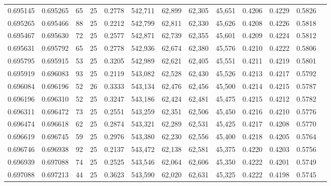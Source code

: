 \begin{tabular}{rrrrrrrrrrrrr}
0.695145 & 0.695265 &    65 &  25 &                                     0.2778 & 542,711 &  62,899 &  62,305 &  45,651 & 0.4206 & 0.4229 & 0.5826 \\
0.695265 & 0.695466 &    88 &  25 &                                     0.2212 & 542,799 &  62,811 &  62,330 &  45,626 & 0.4208 & 0.4226 & 0.5818 \\
0.695467 & 0.695630 &    72 &  25 &                                     0.2577 & 542,871 &  62,739 &  62,355 &  45,601 & 0.4209 & 0.4224 & 0.5812 \\
0.695631 & 0.695792 &    65 &  25 &                                     0.2778 & 542,936 &  62,674 &  62,380 &  45,576 & 0.4210 & 0.4222 & 0.5806 \\
0.695795 & 0.695915 &    53 &  25 &                                     0.3205 & 542,989 &  62,621 &  62,405 &  45,551 & 0.4211 & 0.4219 & 0.5801 \\
0.695919 & 0.696083 &    93 &  25 &                                     0.2119 & 543,082 &  62,528 &  62,430 &  45,526 & 0.4213 & 0.4217 & 0.5792 \\
0.696084 & 0.696196 &    52 &  26 &                                     0.3333 & 543,134 &  62,476 &  62,456 &  45,500 & 0.4214 & 0.4215 & 0.5787 \\
0.696196 & 0.696310 &    52 &  25 &                                     0.3247 & 543,186 &  62,424 &  62,481 &  45,475 & 0.4215 & 0.4212 & 0.5782 \\
0.696311 & 0.696472 &    73 &  25 &                                     0.2551 & 543,259 &  62,351 &  62,506 &  45,450 & 0.4216 & 0.4210 & 0.5776 \\
0.696474 & 0.696618 &    62 &  25 &                                     0.2874 & 543,321 &  62,289 &  62,531 &  45,425 & 0.4217 & 0.4208 & 0.5770 \\
0.696619 & 0.696745 &    59 &  25 &                                     0.2976 & 543,380 &  62,230 &  62,556 &  45,400 & 0.4218 & 0.4205 & 0.5764 \\
0.696746 & 0.696938 &    92 &  25 &                                     0.2137 & 543,472 &  62,138 &  62,581 &  45,375 & 0.4220 & 0.4203 & 0.5756 \\
0.696939 & 0.697088 &    74 &  25 &                                     0.2525 & 543,546 &  62,064 &  62,606 &  45,350 & 0.4222 & 0.4201 & 0.5749 \\
0.697088 & 0.697213 &    44 &  25 &                                     0.3623 & 543,590 &  62,020 &  62,631 &  45,325 & 0.4222 & 0.4198 & 0.5745 \\

\end{tabular}

